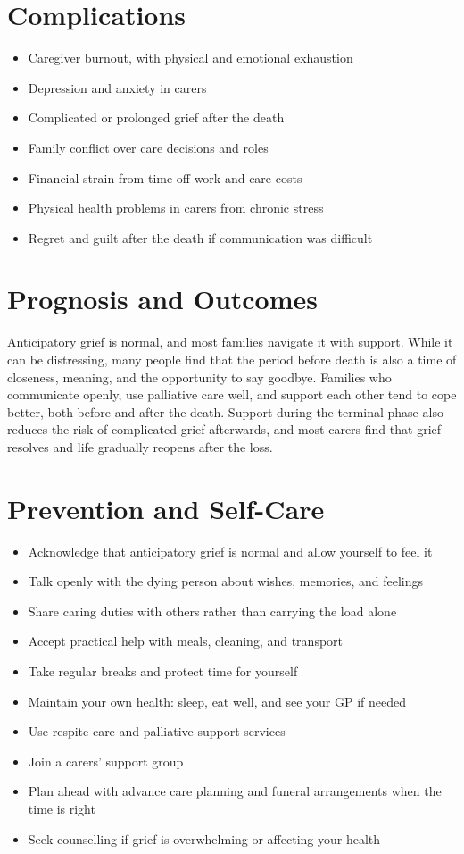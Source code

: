 \section*{Complications}
\begin{itemize}
    \item Caregiver burnout, with physical and emotional exhaustion
    \item Depression and anxiety in carers
    \item Complicated or prolonged grief after the death
    \item Family conflict over care decisions and roles
    \item Financial strain from time off work and care costs
    \item Physical health problems in carers from chronic stress
    \item Regret and guilt after the death if communication was difficult
\end{itemize}

\section*{Prognosis and Outcomes}
Anticipatory grief is normal, and most families navigate it with support. While it can be distressing, many people find that the period before death is also a time of closeness, meaning, and the opportunity to say goodbye. Families who communicate openly, use palliative care well, and support each other tend to cope better, both before and after the death. Support during the terminal phase also reduces the risk of complicated grief afterwards, and most carers find that grief resolves and life gradually reopens after the loss.

\section*{Prevention and Self-Care}
\begin{itemize}
    \item Acknowledge that anticipatory grief is normal and allow yourself to feel it
    \item Talk openly with the dying person about wishes, memories, and feelings
    \item Share caring duties with others rather than carrying the load alone
    \item Accept practical help with meals, cleaning, and transport
    \item Take regular breaks and protect time for yourself
    \item Maintain your own health: sleep, eat well, and see your GP if needed
    \item Use respite care and palliative support services
    \item Join a carers' support group
    \item Plan ahead with advance care planning and funeral arrangements when the time is right
    \item Seek counselling if grief is overwhelming or affecting your health
\end{itemize}


